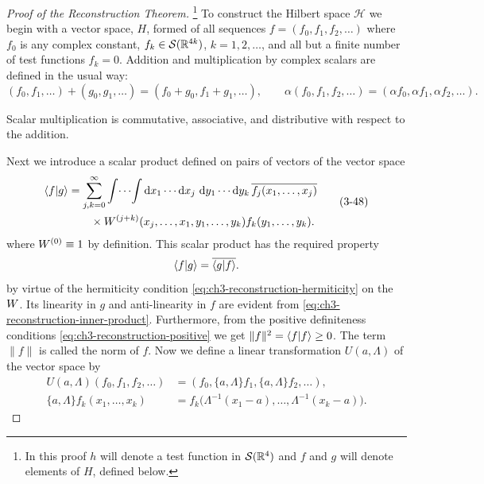 \begin{proof}[Proof of the Reconstruction Theorem]\label{proof:ch3-reconstruction}
\footnote{In this proof \(h\) will denote a test function in
\(\mathcal{S}(\mathbb{R}^4)\) and \(f\) and \(g\) will denote elements of \(H\),
defined below.}
To construct the Hilbert space \(\mathcal H\) we begin with a vector space,
\(H\), formed of all sequences \(f=(f_0,f_1,f_2,\ldots)\) where \(f_0\) is
any complex constant, \(f_k\in\mathcal{S}(\mathbb{R}^{4k})\), \(k=1,2,\ldots\), and all
but a finite number of test functions \(f_k=0\).  Addition and multiplication
by complex scalars are defined in the usual way:
\begin{equation*}
(f_0,f_1,\ldots)+(g_0,g_1,\ldots)
 =(f_0+g_0,f_1+g_1,\ldots),
\qquad
\alpha(f_0,f_1,f_2,\ldots)
 =(\alpha f_0,\alpha f_1,\alpha f_2,\ldots) .
\end{equation*}

Scalar multiplication is commutative, associative, and distributive with
respect to the addition.

Next we introduce a scalar product defined on pairs of vectors of the vector
space
\begin{equation}
\begin{aligned}
\langle f\vert g\rangle
 &=\sum_{j,k=0}^{\infty}\int\!\cdots\!\int
 \mathop{}\!\mathrm{d} x_1\cdots\mathop{}\!\mathrm{d} x_j\,\mathop{}\!\mathrm{d} y_1\cdots\mathop{}\!\mathrm{d} y_k\,
 \overline{f_j(x_1,\ldots,x_j)} \\
 &\qquad\times
 W^{(j+k)}(x_j,\ldots,x_1,y_1,\ldots,y_k)
 f_k(y_1,\ldots,y_k) .
\end{aligned}
\tag{3-48}\label{eq:ch3-reconstruction-inner-product}
\end{equation}
where \(W^{(0)}\equiv 1\) by definition.  This scalar product has
the required property
\begin{equation*}
\langle f\vert g\rangle=\overline{\langle g\vert f\rangle} .
\end{equation*}
by virtue of the hermiticity condition \eqref{eq:ch3-reconstruction-hermiticity} on the \(W\).  Its
linearity in \(g\) and anti-linearity in \(f\) are evident from \eqref{eq:ch3-reconstruction-inner-product}.
Furthermore, from the positive definiteness conditions \eqref{eq:ch3-reconstruction-positive} we get
\(\lVert f\rVert^2=\langle f\vert f\rangle\geq 0\).  The term \(\lVert f\rVert\) is
called the norm of \(f\).  Now we define a linear transformation
\(U(a,\Lambda)\) of the vector space by
\begin{equation}
\begin{aligned}
U(a,\Lambda)(f_0,f_1,f_2,\ldots)
 &= (f_0,\{a,\Lambda\}f_1,\{a,\Lambda\}f_2,\ldots),\\
\{a,\Lambda\}f_k(x_1,\ldots,x_k)
 &= f_k\bigl(\Lambda^{-1}(x_1-a),\ldots,\Lambda^{-1}(x_k-a)\bigr) .
\end{aligned}
\tag{3-49}\label{eq:ch3-reconstruction-group-action}
\end{equation}


\end{proof}

